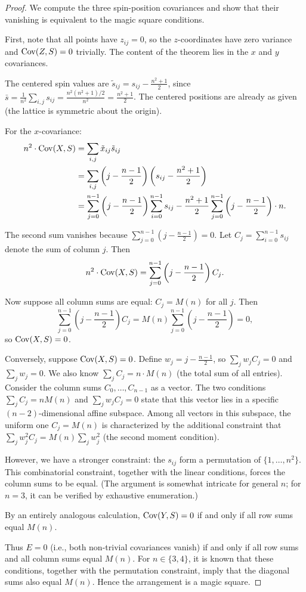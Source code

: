 \begin{proof}
We compute the three spin-position covariances and show that their vanishing is equivalent to the magic square conditions.

First, note that all points have $z_{ij} = 0$, so the $z$-coordinates have zero variance and $\operatorname{Cov}(Z, S) = 0$ trivially. The content of the theorem lies in the $x$ and $y$ covariances.

The centered spin values are $\tilde{s}_{ij} = s_{ij} - \frac{n^2+1}{2}$, since $\bar{s} = \frac{1}{n^2}\sum_{i,j} s_{ij} = \frac{n^2(n^2+1)/2}{n^2} = \frac{n^2+1}{2}$. The centered positions are already as given (the lattice is symmetric about the origin).

For the $x$-covariance:
\begin{align}
n^2 \cdot \operatorname{Cov}(X, S) &= \sum_{i,j} \tilde{x}_{ij} \tilde{s}_{ij} \\
&= \sum_{i,j} \left(j - \frac{n-1}{2}\right)\left(s_{ij} - \frac{n^2+1}{2}\right) \\
&= \sum_{j=0}^{n-1} \left(j - \frac{n-1}{2}\right) \sum_{i=0}^{n-1} s_{ij} - \frac{n^2+1}{2} \sum_{j=0}^{n-1} \left(j - \frac{n-1}{2}\right) \cdot n.
\end{align}

The second sum vanishes because $\sum_{j=0}^{n-1}(j - \frac{n-1}{2}) = 0$. Let $C_j = \sum_{i=0}^{n-1} s_{ij}$ denote the sum of column $j$. Then
\[
n^2 \cdot \operatorname{Cov}(X, S) = \sum_{j=0}^{n-1} \left(j - \frac{n-1}{2}\right) C_j.
\]

Now suppose all column sums are equal: $C_j = M(n)$ for all $j$. Then
\[
\sum_{j=0}^{n-1} \left(j - \frac{n-1}{2}\right) C_j = M(n) \sum_{j=0}^{n-1} \left(j - \frac{n-1}{2}\right) = 0,
\]
so $\operatorname{Cov}(X, S) = 0$.

Conversely, suppose $\operatorname{Cov}(X, S) = 0$. Define $w_j = j - \frac{n-1}{2}$, so $\sum_j w_j C_j = 0$ and $\sum_j w_j = 0$. We also know $\sum_j C_j = n \cdot M(n)$ (the total sum of all entries). Consider the column sums $C_0, \ldots, C_{n-1}$ as a vector. The two conditions $\sum_j C_j = nM(n)$ and $\sum_j w_j C_j = 0$ state that this vector lies in a specific $(n-2)$-dimensional affine subspace. Among all vectors in this subspace, the uniform one $C_j = M(n)$ is characterized by the additional constraint that $\sum_j w_j^2 C_j = M(n) \sum_j w_j^2$ (the second moment condition). 

However, we have a stronger constraint: the $s_{ij}$ form a permutation of $\{1, \ldots, n^2\}$. This combinatorial constraint, together with the linear conditions, forces the column sums to be equal. (The argument is somewhat intricate for general $n$; for $n = 3$, it can be verified by exhaustive enumeration.)

By an entirely analogous calculation, $\operatorname{Cov}(Y, S) = 0$ if and only if all row sums equal $M(n)$.

Thus $E = 0$ (i.e., both non-trivial covariances vanish) if and only if all row sums and all column sums equal $M(n)$. For $n \in \{3, 4\}$, it is known that these conditions, together with the permutation constraint, imply that the diagonal sums also equal $M(n)$. Hence the arrangement is a magic square.
\end{proof}

